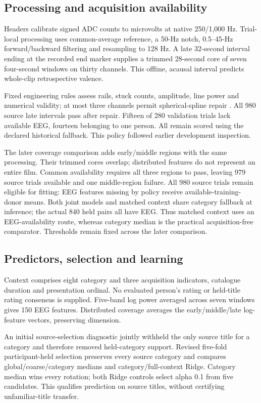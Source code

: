 \documentclass[11pt,a4paper]{article}
\begin{document}
\subsection{Processing and acquisition availability}
Headers calibrate signed ADC counts to microvolts at native 250/1,000 Hz. Trial-local processing uses common-average reference, a 50-Hz notch, 0.5--45-Hz forward/backward filtering and resampling to 128 Hz. A late 32-second interval ending at the recorded end marker supplies a trimmed 28-second core of seven four-second windows on thirty channels. This offline, acausal interval predicts whole-clip retrospective valence.

Fixed engineering rules assess rails, stuck counts, amplitude, line power and numerical validity; at most three channels permit spherical-spline repair \cite{perrin1989spherical}. All 980 source late intervals pass after repair. Fifteen of 280 validation trials lack available EEG, fourteen belonging to one person. All remain scored using the declared historical fallback. This policy followed earlier development inspection.

The later coverage comparison adds early/middle regions with the same processing. Their trimmed cores overlap; distributed features do not represent an entire film. Common availability requires all three regions to pass, leaving 979 source trials available and one middle-region failure. All 980 source trials remain eligible for fitting: EEG features missing by policy receive available-training-donor means. Both joint models and matched context share category fallback at inference; the actual 840 held pairs all have EEG. Thus matched context uses an EEG-availability route, whereas category median is the practical acquisition-free comparator. Thresholds remain fixed across the later comparison.

\subsection{Predictors, selection and learning}
Context comprises eight category and three acquisition indicators, catalogue duration and presentation ordinal. No evaluated person's rating or held-title rating consensus is supplied. Five-band log power averaged across seven windows gives 150 EEG features. Distributed coverage averages the early/middle/late log-feature vectors, preserving dimension.

An initial source-selection diagnostic jointly withheld the only source title for a category and therefore removed held-category support. Revised five-fold participant-held selection preserves every source category and compares global/coarse/category medians and category/full-context Ridge. Category median wins every rotation; both Ridge controls select alpha 0.1 from five candidates. This qualifies prediction on source titles, without certifying unfamiliar-title transfer.
\end{document}
